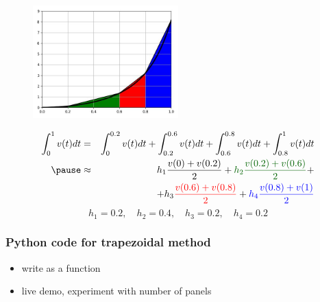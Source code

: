 \documentclass[english,14pt]{beamer}
\newcommand\red[1]{{\color{red} #1}}
\newcommand\blue[1]{{\color{blue} #1}}
\newcommand\darkGreen[1]{{\color{darkGreen} #1}}
\begin{document}
\begin{frame}[fragile]

\frametitle{}

\begin{figure}[ht]
	\centering
	\includegraphics[width=0.5\textwidth]{figures/fourPanel}
\end{figure}
\vspace*{-5mm}
{\small
\begin{eqnarray*}
\int_0^1 v(t)dt & = & \int_0^{0.2} v(t)dt + \int_{0.2}^{0.6} v(t)dt + \int_{0.6}^{0.8} v(t)dt + \int_{0.8}^1 v(t)dt \\
\pause
&\approx & h_1 \frac{v(0) + v(0.2)}{2} + \darkGreen{h_2 \frac{v(0.2) + v(0.6)}{2}} + \\
& & +h_3 \red{\frac{v(0.6) + v(0.8)}{2}} + \blue{h_4 \frac{v(0.8) + v(1)}{2}} 
\end{eqnarray*}
}
\pause
\vspace*{-5mm}
\[
h_1 = 0.2, \quad h_2 = 0.4, \quad h_3 = 0.2, \quad h_4 = 0.2
\]

\end{frame}


\begin{frame}[fragile]

\frametitle{Python code for trapezoidal method}

\begin{itemize}
	\item write as a function
	\item live demo, experiment with number of panels
\end{itemize}

\end{frame}

\end{document}
